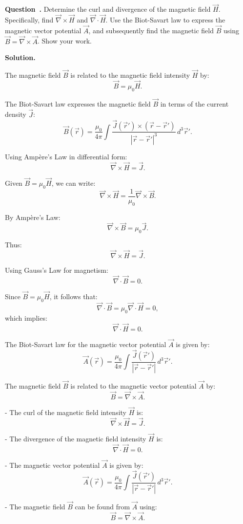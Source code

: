 \documentclass[12pt, a4paper, oneside]{report}
\newcounter{question}
\newenvironment{question}[1][]{\refstepcounter{question}\par\medskip
   \begin{mdframed}[backgroundcolor=gray!20]
   \noindent \textbf{Question~\thequestion. #1} \rmfamily}{\end{mdframed}\medskip}
\newenvironment{solution}{
  \par\medskip\noindent
  \textbf{Solution.}\quad\itshape
  \par\noindent\makebox[\linewidth]{\rule{\textwidth}{0.4pt}}
}{
  \par\noindent\makebox[\linewidth]{\rule{\textwidth}{0.4pt}}
  \par\medskip
}
\begin{document}
\newpage
\begin{question}
Determine the curl and divergence of the magnetic field \( \vec{H} \). Specifically, find \( \vec{\nabla} \times \vec{H} \) and \( \vec{\nabla} \cdot \vec{H} \). Use the Biot-Savart law to express the magnetic vector potential \( \vec{A} \), and subsequently find the magnetic field \( \vec{B} \) using \( \vec{B} = \vec{\nabla} \times \vec{A} \). Show your work.
\end{question}


\begin{solution}


The magnetic field \(\vec{B}\) is related to the magnetic field intensity \(\vec{H}\) by:
\[
\vec{B} = \mu_0 \vec{H}.
\]

The Biot-Savart law expresses the magnetic field \(\vec{B}\) in terms of the current density \(\vec{J}\):
\[
\vec{B}(\vec{r}) = \frac{\mu_0}{4\pi} \int \frac{\vec{J}(\vec{r}') \times (\vec{r} - \vec{r}')}{|\vec{r} - \vec{r}'|^3} \, d^3\vec{r}'.
\]


Using Ampère's Law in differential form:
\[
\vec{\nabla} \times \vec{H} = \vec{J}.
\]

Given \(\vec{B} = \mu_0 \vec{H}\), we can write:
\[
\vec{\nabla} \times \vec{H} = \frac{1}{\mu_0} \vec{\nabla} \times \vec{B}.
\]

By Ampère's Law:
\[
\vec{\nabla} \times \vec{B} = \mu_0 \vec{J}.
\]

Thus:
\[
\vec{\nabla} \times \vec{H} = \vec{J}.
\]


Using Gauss's Law for magnetism:
\[
\vec{\nabla} \cdot \vec{B} = 0.
\]

Since \(\vec{B} = \mu_0 \vec{H}\), it follows that:
\[
\vec{\nabla} \cdot \vec{B} = \mu_0 \vec{\nabla} \cdot \vec{H} = 0,
\]
which implies:
\[
\vec{\nabla} \cdot \vec{H} = 0.
\]


The Biot-Savart law for the magnetic vector potential \(\vec{A}\) is given by:
\[
\vec{A}(\vec{r}) = \frac{\mu_0}{4\pi} \int \frac{\vec{J}(\vec{r}')}{|\vec{r} - \vec{r}'|} \, d^3\vec{r}'.
\]

The magnetic field \(\vec{B}\) is related to the magnetic vector potential \(\vec{A}\) by:
\[
\vec{B} = \vec{\nabla} \times \vec{A}.
\]

- The curl of the magnetic field intensity \(\vec{H}\) is:
\[
\vec{\nabla} \times \vec{H} = \vec{J}.
\]

- The divergence of the magnetic field intensity \(\vec{H}\) is:
\[
\vec{\nabla} \cdot \vec{H} = 0.
\]

- The magnetic vector potential \(\vec{A}\) is given by:
\[
\vec{A}(\vec{r}) = \frac{\mu_0}{4\pi} \int \frac{\vec{J}(\vec{r}')}{|\vec{r} - \vec{r}'|} \, d^3\vec{r}'.
\]

- The magnetic field \(\vec{B}\) can be found from \(\vec{A}\) using:
\[
\vec{B} = \vec{\nabla} \times \vec{A}.
\]

\end{solution}
\end{document}

